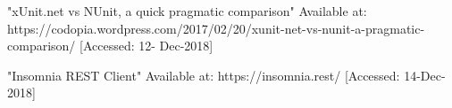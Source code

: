  "xUnit.net vs NUnit, a quick pragmatic comparison" Available at: https://codopia.wordpress.com/2017/02/20/xunit-net-vs-nunit-a-pragmatic-comparison/ [Accessed: 12- Dec-2018]

 "Insomnia REST Client" Available at: https://insomnia.rest/ [Accessed: 14-Dec-2018]